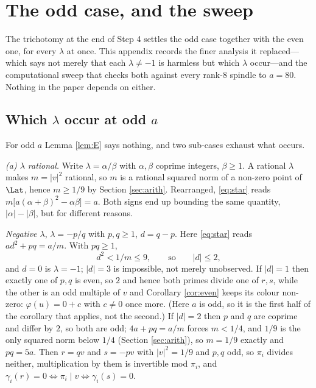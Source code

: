 %
%

\appendix

\section{The odd case, and the sweep}\label{app:odd}

The trichotomy at the end of Step 4 settles the odd case together with the even
one, for every $\lambda$ at once. This appendix records the finer analysis it
replaced---which says not merely that each $\lambda \ne -1$ is harmless but which
$\lambda$ occur---and the computational sweep that checks both against every
rank-$8$ spindle to $a = 80$. Nothing in the paper depends on either.

\subsection*{Which $\lambda$ occur at odd $a$}
For odd $a$ Lemma \ref{lem:E} says nothing, and two sub-cases exhaust what occurs.

\emph{(a) $\lambda$ rational.} Write $\lambda = \alpha/\beta$ with
$\alpha, \beta$ coprime integers, $\beta \ge 1$. A rational $\lambda$ makes
$m = \lvert v \rvert^2$ rational, so $m$ is a rational squared norm of a non-zero
point of $\Lat$, hence $m \ge 1/9$ by Section \ref{sec:arith}. Rearranged,
\eqref{eq:star} reads $m\big[a(\alpha+\beta)^2 - \alpha\beta\big] = a$. Both
signs end up bounding the same quantity, $\lvert\alpha\rvert - \lvert\beta\rvert$,
but for different reasons.

\emph{Negative $\lambda$}, $\lambda = -p/q$ with $p,q \ge 1$, $d = q-p$. Here
\eqref{eq:star} reads $a d^2 + pq = a/m$. With $pq \ge 1$,
\[
  d^2 < 1/m \le 9, \qquad\text{so}\qquad \lvert d \rvert \le 2 ,
\]
and $d = 0$ is $\lambda = -1$; $\lvert d \rvert = 3$ is impossible, not merely
unobserved. If $\lvert d \rvert = 1$ then exactly one of $p,q$ is even, so $2$ and
hence both primes divide one of $r,s$, while the other is an odd multiple of $v$
and Corollary \ref{cor:even} keeps its colour non-zero: $\varphi(u) = 0 + c$ with
$c \ne 0$ once more. (Here $a$ is odd, so it is the first half of the corollary
that applies, not the second.) If $\lvert d \rvert = 2$ then $p$ and $q$ are coprime and differ by $2$, so
both are odd; $4a + pq = a/m$ forces $m < 1/4$, and $1/9$ is the only squared
norm below $1/4$ (Section \ref{sec:arith}), so $m = 1/9$ exactly and
$pq = 5a$. Then $r = qv$ and $s = -pv$ with $\lvert v \rvert^2 = 1/9$ and $p,q$
odd, so $\pi_i$ divides neither, multiplication by them is invertible mod $\pi_i$,
and $\gamma_i(r) = 0 \iff \pi_i \mid v \iff \gamma_i(s) = 0$.

